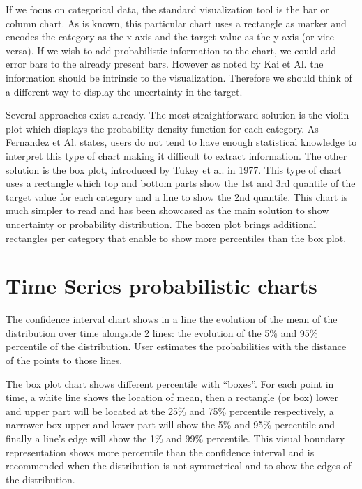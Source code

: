 \documentclass[a4paper,3p,sort&compress]{elsarticle}
\begin{document}
If we focus on categorical data, the standard visualization tool is the bar or
column chart. As is known, this particular chart uses a rectangle as marker and
encodes the category as the x-axis and the target value as the y-axis (or vice
versa). If we wish to add probabilistic information to the chart, we could add
error bars to the already present bars. However as noted by Kai et Al. the
information should be intrinsic to the visualization. Therefore we should think
of a different way to display the uncertainty in the target.

Several approaches exist already. The most straightforward solution is the
violin plot  which displays the probability density function for each
category. As Fernandez et Al. states, users do not tend to have enough
statistical knowledge to interpret this type of chart making it difficult to
extract information. The other solution is the box plot, introduced by Tukey et
al. in 1977. This type of chart uses a rectangle which top and bottom parts show
the 1st and 3rd quantile of the target value for each category and a line to
show the 2nd quantile. This chart is much simpler to read and has been showcased
as the main solution to show uncertainty or probability distribution. The boxen
plot brings additional rectangles per category that enable to show more
percentiles than the box plot.

\section{Time Series probabilistic charts} 
\label{sec:time_series}

The confidence interval chart shows in a line the evolution of the mean of the distribution
 over time alongside 2 lines: the evolution of the 5\% and 95\% percentile of the distribution. 
 User estimates the probabilities with the distance of the points to those lines.

The box plot chart shows different percentile with “boxes”. For each point in time, a white 
line shows the location of mean, then a rectangle (or box) lower and upper part will be located 
at the 25\% and 75\% percentile respectively, a narrower box upper and lower part will show 
the 5\% and 95\% percentile and finally a line’s edge will show the 1\% and 99\% percentile. 
This visual boundary representation shows more percentile than the confidence interval and 
is recommended when the distribution is not symmetrical and to show the edges of the distribution.
\end{document}
